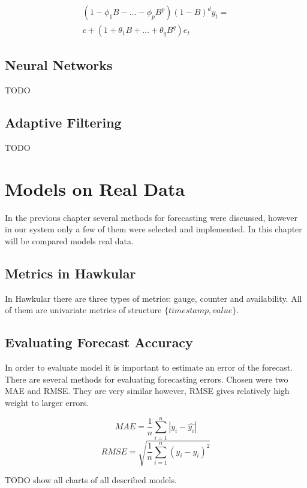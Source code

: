     \begin{eqnarray} \label{arima}
        (1- \phi_1B - \dots - \phi_pB^p)(1-B)^d y_t = \\ \nonumber
         c + (1+\theta_1B+\dots+\theta_qB^q) e_t
    \end{eqnarray}

    \section{Neural Networks}
    TODO

    \section{Adaptive Filtering}
    TODO


\chapter{Models on Real Data}
In the previous chapter several methods for forecasting were discussed, however
in our system only a few of them were selected and implemented. In this chapter 
will be compared models real data.

    \section{Metrics in Hawkular}
    In Hawkular there are three types of metrics: gauge, counter and availability. 
    All of them are univariate metrics of structure $ \{timestamp, value\} $.

    \section{Evaluating Forecast Accuracy}
    In order to evaluate model it is important to estimate an error of the forecast. There are 
    several methods for evaluating forecasting errors. Chosen were two MAE and RMSE. They are 
    very similar however, RMSE gives relatively high weight to larger errors.

    $$ MAE = \frac{1}{n} \sum_{i=1}^{n} |y_i - \hat{y_i}| $$
    $$ RMSE = \sqrt{\frac{1}{n} \sum_{i=1}^{n}(y_i - \hat{y_i})^2} $$

    TODO show all charts of all described models. 

